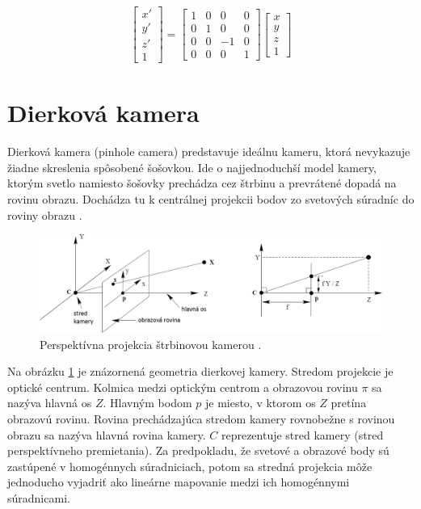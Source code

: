 \begin{equation}
\label{eq_kalib_sumer_z}
\begin{aligned}
\begin{bmatrix}
x' \\ y' \\ z' \\ 1 
\end{bmatrix}
=
\begin{bmatrix}
1 & 0 & 0 & 0 \\
0 & 1 & 0 & 0 \\
0 & 0 & -1 & 0 \\
0 & 0 & 0 & 1 
\end{bmatrix}
\begin{bmatrix}
x \\ y \\ z \\ 1 
\end{bmatrix}
\end{aligned}
\end{equation}




\section{Dierková kamera}
Dierková kamera (pinhole camera) predstavuje ideálnu kameru, ktorá nevykazuje žiadne skreslenia spôsobené šošovkou. Ide o najjednoduchší model kamery, ktorým svetlo namiesto šošovky prechádza cez štrbinu a prevrátené dopadá na rovinu obrazu. Dochádza tu k centrálnej projekcii bodov zo svetových súradníc do roviny obrazu \cite{zisserman2004multiple}.

\begin{figure}[h]
	\centering
	\includegraphics[width=\textwidth]{figures/pinhole_camera.jpg} 
	\caption{Perspektívna projekcia štrbinovou kamerou \cite{zisserman2004multiple}.}
	\label{fig:pinhole_camera}
\end{figure}

Na obrázku \ref{fig:pinhole_camera} je znázornená geometria dierkovej kamery. Stredom projekcie je optické centrum. Kolmica medzi optickým centrom a obrazovou rovinu $\pi$ sa nazýva hlavná os $Z$. Hlavným bodom $p$ je miesto, v ktorom os $Z$ pretína obrazovú rovinu. Rovina prechádzajúca stredom kamery rovnobežne s rovinou obrazu sa nazýva hlavná rovina kamery. $C$ reprezentuje stred kamery (stred perspektívneho premietania). Za predpokladu, že svetové a obrazové body sú zastúpené v homogénnych súradniciach, potom sa stredná projekcia môže jednoducho vyjadriť ako lineárne mapovanie medzi ich homogénnymi súradnicami.

